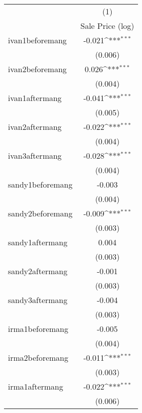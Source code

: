 {
\def\sym#1{\ifmmode^{#1}\else\(^{#1}\)\fi}
\begin{tabular}{l*{1}{c}}
\hline\hline
                    &\multicolumn{1}{c}{(1)}\\
                    &\multicolumn{1}{c}{Sale Price (log)}\\
\hline
ivan1beforemang     &      -0.021\sym{***}\\
                    &     (0.006)         \\
[1em]
ivan2beforemang     &       0.026\sym{***}\\
                    &     (0.004)         \\
[1em]
ivan1aftermang      &      -0.041\sym{***}\\
                    &     (0.005)         \\
[1em]
ivan2aftermang      &      -0.022\sym{***}\\
                    &     (0.004)         \\
[1em]
ivan3aftermang      &      -0.028\sym{***}\\
                    &     (0.004)         \\
[1em]
sandy1beforemang    &      -0.003         \\
                    &     (0.004)         \\
[1em]
sandy2beforemang    &      -0.009\sym{***}\\
                    &     (0.003)         \\
[1em]
sandy1aftermang     &       0.004         \\
                    &     (0.003)         \\
[1em]
sandy2aftermang     &      -0.001         \\
                    &     (0.003)         \\
[1em]
sandy3aftermang     &      -0.004         \\
                    &     (0.003)         \\
[1em]
irma1beforemang     &      -0.005         \\
                    &     (0.004)         \\
[1em]
irma2beforemang     &      -0.011\sym{***}\\
                    &     (0.003)         \\
[1em]
irma1aftermang      &      -0.022\sym{***}\\
                    &     (0.006)         \\

\end{tabular}}

